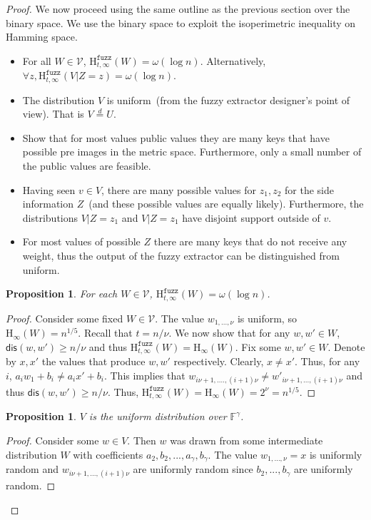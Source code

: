 \documentclass[11pt]{article}
\newcommand{\dis}{\ensuremath{\mathsf{dis}}}
\newcommand{\Hoo}{\mathrm{H}_\infty}
\newcommand{\Hfuzz}{\mathrm{H}^{\mathtt{fuzz}}_{t,\infty}}
\newtheorem{proposition}[theorem]{Proposition}
\begin{document}
\begin{proof}
We now proceed using the same outline as the previous section over the binary space.  We use the binary space to exploit the isoperimetric inequality on Hamming space.
\begin{itemize}
\item For all $W\in \mathcal{V}$, $\Hfuzz(W) = \omega (\log n)$. Alternatively, $\forall z, \Hfuzz(V | Z=z) = \omega(\log n)$.
\item The distribution $V$ is uniform~(from the fuzzy extractor designer's point of view).  That is $V\overset{d}=U$.
\item Show that for most values public values they are many keys that have possible pre images in the metric space.  Furthermore, only a small number of the public values are feasible.
\item Having seen $v\in V$, there are many possible values for $z_1, z_2$ for the side information $Z$~(and these possible values are equally likely).  Furthermore, the distributions $V|Z=z_1 $ and $V| Z=z_1$ have disjoint support outside of $v$.
\item For most values of possible $Z$ there are many keys that do not receive any weight, thus the output of the fuzzy extractor can be distinguished from uniform.
\end{itemize}

\begin{proposition} 
For each $W\in\mathcal{V}$, $\Hfuzz(W) = \omega(\log n)$.
\end{proposition}
\begin{proof}
Consider some fixed $W\in\mathcal{V}$.  The value $w_{1,..., \nu}$ is uniform, so $\Hoo(W) =n^{1/5}$.  Recall that $t= n/\nu$.  We now show that for any $w, w'\in W$, $\dis(w, w') \ge n/\nu$ and thus $\Hfuzz(W) = \Hoo(W)$.  Fix some $w, w'\in W$.  Denote by $x, x'$ the values that produce $w, w'$ respectively.  Clearly, $x\neq x'$.  Thus, for any $i$, $a_i w_1 + b_i \neq a_i x' + b_i$.  This implies that $w_{i\nu+1,...., (i+1)\nu} \neq w'_{i\nu+1,..., (i+1)\nu}$ and thus $\dis(w, w') \ge n/\nu$.  Thus, $\Hfuzz(W) = \Hoo(W)= 2^\nu = n^{1/5}$.
\end{proof}

\begin{proposition}$V$ is the uniform distribution over $\mathbb{F}^\gamma$.
\end{proposition}
\begin{proof}
Consider some $w\in V$.  Then $w$ was drawn from some intermediate distribution $W$ with coefficients $a_2, b_2, ..., a_\gamma , b_\gamma$.  The value $w_{1,...,\nu} =x $ is uniformly random and $w_{i\nu+1,...,(i+1)\nu}$ are uniformly random since $b_2,..., b_\gamma$ are uniformly random.
\end{proof}


\end{proof}
\end{document}
